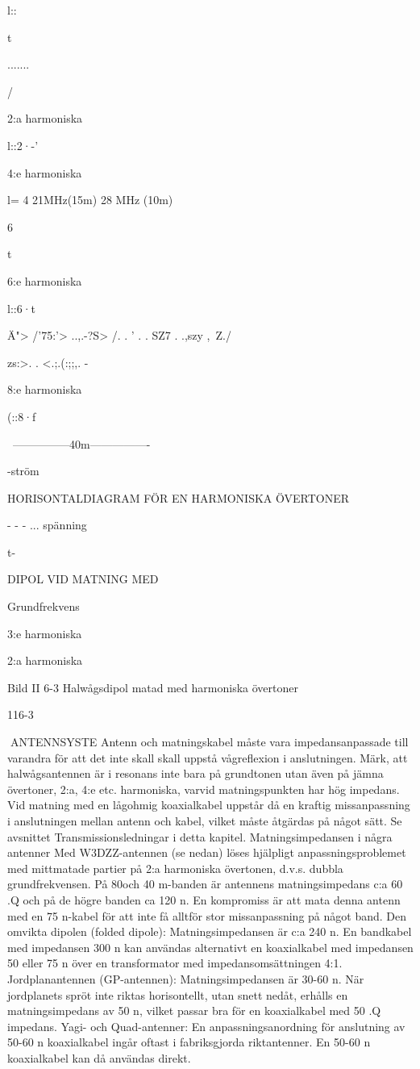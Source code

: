 {{l::

t

.......

/

2:a harmoniska

l::2·-'

4:e harmoniska

l= 4
21MHz(15m)
28 MHz (10m)

6

t

6:e harmoniska

l::6·t

Ä"> /'75:'> ..,.-?S> /. .
' . . SZ7 . .,szy ,\ Z./

zs:>. . <.;.(:;;,. -

8:e harmoniska

(::8·f

~---------------40m----------------~

-ström

HORISONTALDIAGRAM FÖR EN
HARMONISKA ÖVERTONER

- - - ... spänning

t-

DIPOL VID MATNING MED

Grundfrekvens

3:e harmoniska

2:a harmoniska

Bild II 6-3 Halwågsdipol matad med harmoniska övertoner

116-3

ANTENNSYSTE
Antenn och matningskabel måste vara
impedansanpassade till varandra för att det
inte skall skall uppstå vågreflexion i anslutningen.
Märk, att halwågsantennen är i resonans inte bara på grundtonen utan även på
jämna övertoner, 2:a, 4:e etc. harmoniska,
varvid matningspunkten har hög impedans.
Vid matning med en lågohmig koaxialkabel
uppstår då en kraftig missanpassning i anslutningen mellan antenn och kabel, vilket
måste åtgärdas på något sätt. Se avsnittet
Transmissionsledningar i detta kapitel.
Matningsimpedansen i några antenner
Med W3DZZ-antennen (se nedan) löses
hjälpligt anpassningsproblemet med mittmatade partier på 2:a harmoniska övertonen, d.v.s. dubbla grundfrekvensen. På 80och 40 m-banden är antennens matningsimpedans c:a 60 .Q och på de högre banden
ca 120 n. En kompromiss är att mata denna
antenn med en 75 n-kabel för att inte få
alltför stor missanpassning på något band.
Den omvikta dipolen (folded dipole):
Matningsimpedansen är c:a 240 n. En
bandkabel med impedansen 300 n kan användas alternativt en koaxialkabel med
impedansen 50 eller 75 n över en transformator med impedansomsättningen 4:1.
Jordplanantennen (GP-antennen):
Matningsimpedansen är 30-60 n. När
jordplanets spröt inte riktas horisontellt, utan
snett nedåt, erhålls en matningsimpedans
av 50 n, vilket passar bra för en koaxialkabel med 50 .Q impedans.
Yagi- och Quad-antenner:
En anpassningsanordning för anslutning
av 50-60 n koaxialkabel ingår oftast i fabriksgjorda riktantenner. En 50-60 n koaxialkabel kan då användas direkt.

}}

